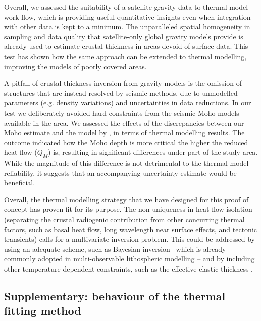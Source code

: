 {Overall, we assessed the suitability of a satellite gravity data to thermal model work flow, which is providing useful quantitative insights even when integration with other data is kept to a minimum.
The unparalleled spatial homogeneity in sampling and data quality that satellite-only global gravity models provide is already used to estimate crustal thickness in areas devoid of surface data.
This test has shown how the same approach can be extended to thermal modelling, improving the models of poorly covered areas.

A pitfall of crustal thickness inversion from gravity models is the omission of structures that are instead resolved by seismic methods, due to unmodelled parameters (e.g. density variations) and uncertainties in data reductions.
In our test we deliberately avoided hard constraints from the seismic Moho models available in the area.
We assessed the effects of the discrepancies between our Moho estimate and the model by \textcite{Grad2009}, in terms of thermal modelling results.
The outcome indicated how the Moho depth is more critical the higher the reduced heat flow ($Q_M$) is, resulting in significant differences under part of the study area.
While the magnitude of this difference is not detrimental to the thermal model reliability, it suggests that an accompanying uncertainty estimate would be beneficial.

Overall, the thermal modelling strategy that we have designed for this proof of concept has proven fit for its purpose.
The non-uniqueness in heat flow isolation (separating the crustal radiogenic contribution from other concurring thermal factors, such as basal heat flow, long wavelength near surface effects, and tectonic transients) calls for a multivariate inversion problem.
This could be addressed by using an adequate scheme, such as Bayesian inversion \parencite{Mosegaard1995} --which is already commonly adopted in multi-observable lithospheric modelling \parencite[e.g ][]{Mather2018}-- and by including other temperature-dependent constraints, such as the effective elastic thickness \parencite{Burov1995}.

\begin{subappendices}
\section[Supplementary:~behaviour of the thermal fitting method]{Supplementary: behaviour of the thermal fitting method}
\label{s:ApplSup:MethodTests}


\end{subappendices}}
